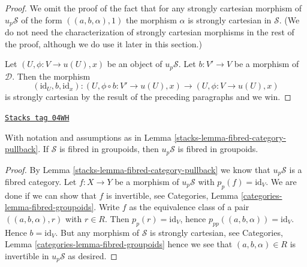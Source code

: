 \begin{proof}
\medskip\noindent
We omit the proof of the fact that for any strongly cartesian morphism
of $u_p\mathcal{S}$ of the form $((a, b, \alpha), 1)$ the morphism
$\alpha$ is strongly cartesian in $\mathcal{S}$.
(We do not need the characterization of strongly cartesian morphisms
in the rest of the proof, although we do use it later in this section.)

\medskip\noindent
Let $(U, \phi : V \to u(U), x)$ be an object of $u_p\mathcal{S}$.
Let $b : V' \to V$ be a morphism of $\mathcal{D}$. Then the morphism
$$
(\text{id}_U, b, \text{id}_x) :
(U, \phi \circ b : V' \to u(U), x)
\longrightarrow
(U, \phi : V \to u(U), x)
$$
is strongly cartesian by the result of the preceding paragraphs and we win.
\end{proof}

\begin{lemma}
\label{stacks-lemma-fibred-groupoids-category-pullback}
\href{https://stacks.math.columbia.edu/tag/04WH}{\texttt{Stacks tag 04WH}}

With notation and assumptions as in
Lemma \ref{stacks-lemma-fibred-category-pullback}.
If $\mathcal{S}$ is fibred in groupoids, then $u_p\mathcal{S}$ is fibred
in groupoids.
\end{lemma}

\begin{proof}

By
Lemma \ref{stacks-lemma-fibred-category-pullback}
we know that $u_p\mathcal{S}$ is a fibred category.
Let $f : X \to Y$ be a morphism of $u_p\mathcal{S}$ with
$p_p(f) = \text{id}_V$. We are done if we can show that $f$ is invertible, see
Categories, Lemma \ref{categories-lemma-fibred-groupoids}.
Write $f$ as the equivalence class of
a pair $((a, b, \alpha), r)$ with $r \in R$. Then $p_p(r) = \text{id}_V$,
hence $p_{pp}((a, b, \alpha)) = \text{id}_V$. Hence $b = \text{id}_V$.
But any morphism of $\mathcal{S}$ is strongly cartesian, see
Categories, Lemma \ref{categories-lemma-fibred-groupoids}
hence we see that $(a, b, \alpha) \in R$ is invertible
in $u_p\mathcal{S}$ as desired.
\end{proof}

